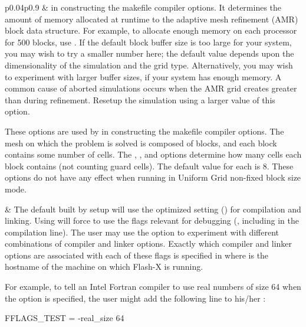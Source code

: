 \begin{longtable}{p{}p{}}
 & %
\setup in constructing the makefile compiler options. It determines
the amount of memory allocated at runtime to the adaptive mesh
refinement (AMR) block data structure. For example, to allocate
enough memory on each processor for 500 blocks, use
. If the default block buffer size is too large
for your system, you may wish to try a smaller number here; the default
value depends upon the dimensionality of the simulation and the grid type.
Alternatively, you may wish to experiment with larger buffer sizes,
if your system has enough memory.  A common cause of aborted simulations
occurs when the AMR grid creates greater than  during refinement.
Resetup the simulation using a larger value of this option. \tr

These options are used by \setup in constructing the makefile
compiler options.  The mesh on which the problem is solved is
composed of blocks, and each block contains some number of cells.
The , , and  options determine how many cells each
block contains (not counting guard cells). The default value
for each is 8. These options do not have any effect
when running in Uniform Grid non-fixed block size mode.\tr

& The default  built by setup will use the optimized
setting () for compilation and linking.  Using 
will force \setup to use the flags relevant for debugging (\eg, including
 in the compilation line). The user may use the option 
to experiment with different combinations of compiler and linker options.
Exactly which compiler and linker options are associated with each of
these flags is specified in  where 
is the hostname of the machine on which Flash-X is running.

For example, to tell an Intel Fortran compiler to use real numbers of size
64 when the  option is specified, the user might add the following
line to his/her :
\begin{codeseg}
FFLAGS_TEST = -real_size 64
\end{codeseg}
\tr


\end{longtable}
